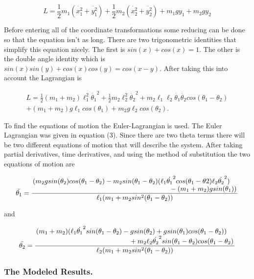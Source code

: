 \documentclass[runningheads]{llncs}
\begin{document}
\begin{equation}
    L = \frac{1}{2}m_{1}(\dot{x_{1}^{2}} + \dot{y_{1}^{2}}) + \frac{1}{2}m_{2}(\dot{x_{2}^{2}} + \dot{y_{2}^{2}}) + m_{1}gy_{1} + m_{2}gy_{2}
\end{equation}

Before entering all of the coordinate transformations some reducing can be done so that the equation isn't as long. There are two trigonometric identities that simplify this equation nicely. The first is $sin(x) + cos(x) = 1$. The other is the double angle identity which is $sin(x)sin(y) + cos(x)cos(y) = cos(x - y)$. After taking this into account the Lagrangian is 

\begin{multline}
    L = \frac{1}{2}(m_{1} + m_{2}) \ell_{1}^{2}\dot{\theta_{1}}^{2} + \frac{1}{2}m_{2}\ell_{2}^{2}\dot{\theta_{2}}^{2} + m_{2}\ell_{1}\ell_{2}  \dot{\theta_{1}}\dot{\theta_{2}}cos(\theta_{1} - \theta_{2})\\ + (m_1 + m_2)g\ell_{1}cos(\theta_{1}) + m_{2}g\ell_{2}cos(\theta_{2}).
\end{multline}

To find the equations of motion the Euler-Lagrangian is used. The Euler Lagrangian was given in equation (3). Since there are two theta terms there will be two different equations of motion that will describe the system. After taking partial derivatives, time derivatives, and using the method of substitution the two equations of motion are 

\begin{multline}
    \ddot{\theta_{1}} = \frac{\splitfrac{(m_{2}gsin(\theta_{2})cos(\theta_{1} - \theta_{2}) - m_{2}sin(\theta_{1} -  \theta_{2}) (\ell_{1}\dot{\theta_{1}}^{2}cos(\theta_{1}- \theta{2}) \ell_{2}\dot{\theta_{2}}^{2})}{  - (m_{1} + m_{2})gsin(\theta_{1}))}}{\ell_{1}(m_{1} + m_{2}sin^{2}(\theta_{1} - \theta_{2}))}
\end{multline}

and

\begin{equation}
   \ddot{\theta_{2}} = \frac{\splitfrac{(m_{1} + m_{2})(\ell_{1}\dot{\theta_{1}}^{2}sin(\theta_{1} - \theta_{2}) - gsin(\theta_{2}) + gsin(\theta_{1})cos(\theta_{1} - \theta_{2}))}{  + m_{2}\ell_{2}\dot{\theta_{2}}^{2}sin(\theta_{1} - \theta_{2})cos(\theta_{1} - \theta_{2})}}{\ell_{2}(m_{1} + m_{2}sin^{2}(\theta_{1} - \theta_{2}))}
\end{equation}

\subsubsection{The Modeled Results.}
\end{document}
